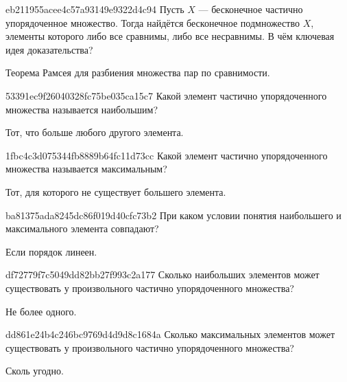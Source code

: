 \begin{note}{eb211955acee4c57a93149e9322d4c94}
    Пусть \({ X }\) --- бесконечное частично упорядоченное множество.
    Тогда найдётся бесконечное подмножество \({ X }\), элементы которого либо все сравнимы, либо все несравнимы.
    В чём ключевая идея доказательства?

    \begin{cloze}{1}
        Теорема Рамсея для разбиения множества пар по сравнимости.
    \end{cloze}
\end{note}

\begin{note}{53391ec9f26040328fc75be035ca15c7}
    Какой элемент частично упорядоченного множества называется наибольшим?

    \begin{cloze}{1}
        Тот, что больше любого другого элемента.
    \end{cloze}
\end{note}

\begin{note}{1fbc4c3d075344fb8889b64fc11d73cc}
    Какой элемент частично упорядоченного множества называется максимальным?

    \begin{cloze}{1}
        Тот, для которого не существует большего элемента.
    \end{cloze}
\end{note}

\begin{note}{ba81375ada8245dc86f019d40cfc73b2}
    При каком условии понятия наибольшего и максимального элемента совпадают?

    \begin{cloze}{1}
        Если порядок линеен.
    \end{cloze}
\end{note}

\begin{note}{df72779f7c5049dd82bb27f993c2a177}
    Сколько наибольших элементов может существовать у произвольного частично упорядоченного множества?

    \begin{cloze}{1}
        Не более одного.
    \end{cloze}
\end{note}

\begin{note}{dd861e24b4c246bc9769d4d9d8c1684a}
    Сколько максимальных элементов может существовать у произвольного частично упорядоченного множества?

    \begin{cloze}{1}
        Сколь угодно.
    \end{cloze}
\end{note}

